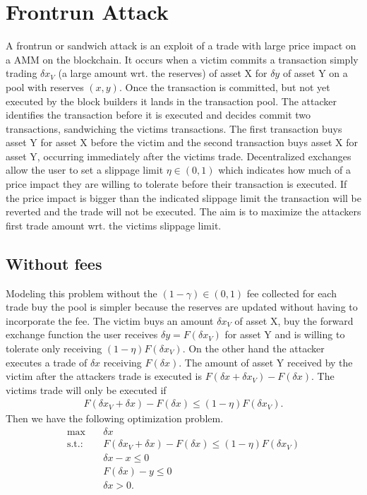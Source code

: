 \section{Frontrun Attack}
A frontrun or sandwich attack is an exploit of a trade with large price
impact on a AMM on the blockchain. It occurs when a victim commits a
transaction simply trading $\delta x_V$ (a large amount wrt. the reserves) of
asset X for $\delta y$ of asset Y on a pool with reserves $(x, y)$. Once the
transaction is committed, but not yet executed by the block builders it lands
in the transaction pool. The attacker identifies the transaction before it is
executed and decides commit two transactions, sandwiching the victims
transactions. The first transaction buys asset Y for asset X before the
victim and the second transaction buys asset X for asset Y, occurring
immediately after the victims trade. Decentralized exchanges allow the user
to set a slippage limit $\eta \in (0, 1)$ which indicates how much of a price
impact they are willing to tolerate before their transaction is executed. If
the price impact is bigger than the indicated slippage limit the transaction
will be reverted and the trade will not be executed. The
aim is to maximize the attackers first trade amount wrt. the victims
slippage limit.
\subsection{Without fees}
Modeling this problem without the $(1-\gamma) \in (0,1)$ fee collected for
each trade buy the pool is simpler because the reserves are updated without
having to incorporate the fee. The victim buys an amount $\delta x_V$ of
asset X, buy the forward exchange function the user receives $\delta y =
F(\delta x_V)$ for asset Y and is willing to tolerate only receiving
$(1-\eta)F(\delta x_V)$. On the other hand the attacker executes a trade of
$\delta x$ receiving $F(\delta x)$. The amount of asset Y received by the
victim after the attackers trade is executed is $F(\delta x + \delta x_V) -
F(\delta x)$. The victims trade will only be executed if
\begin{align}
    F(\delta x_V + \delta x) - F(\delta x) \le (1-\eta) F(\delta x_V).
\end{align}
Then we have the following optimization problem.
\begin{align}
    \max \quad  &\delta x \\
    \text{s.t.:}\quad & F(\delta x_V + \delta x) - F(\delta x) \le (1-\eta)
    F(\delta x_V) \\
              & \delta x - x \le 0 \\
              & F(\delta x) - y \le 0 \\
              & \delta x > 0.
\end{align}
